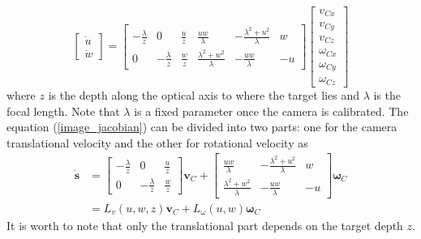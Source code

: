 \begin{equation}
\begin{bmatrix}
\dot{u} \\ \dot{w}
\end{bmatrix}
=\begin{bmatrix}
-\frac{\lambda}{z} & 0 & \frac{u}{z} & \frac{uw}{\lambda} & -\frac{\lambda^2+u^2}{\lambda} & w \\
0 & -\frac{\lambda}{z} & \frac{w}{z} & \frac{\lambda^2+w^2}{\lambda} & -\frac{uw}{\lambda} & -u
\end{bmatrix}
\begin{bmatrix}
v_{Cx} \\ v_{Cy} \\ v_{Cz} \\
\omega_{Cx} \\ \omega_{Cy} \\ \omega_{Cz}
\end{bmatrix}
\label{image_jacobian}
\end{equation}
where $z$ is the depth along the optical axis to where the target lies and $\lambda$ is the focal length. Note that $\lambda$ is a fixed parameter once the camera is calibrated. The equation (\ref{image_jacobian}) can be divided into two parts: one for the camera translational velocity and the other for rotational velocity as
\begin{align}
\mathbf{\dot{s}}&=\begin{bmatrix}
-\frac{\lambda}{z} & 0 & \frac{u}{z} \\
0 & -\frac{\lambda}{z} & \frac{w}{z}
\end{bmatrix}\mathbf{v}_C+
\begin{bmatrix}
\frac{uw}{\lambda} & -\frac{\lambda^2+u^2}{\lambda} & w \\
\frac{\lambda^2+w^2}{\lambda} & -\frac{uw}{\lambda} & -u
\end{bmatrix}\mathbf{\omega}_C
\\&=L_v(u,w,z)\mathbf{v}_C+L_{\omega}(u,w)\mathbf{\omega}_C
\label{image_jacobian1}
\end{align}
It is worth to note that only the translational part depends on the target depth $z$. 

